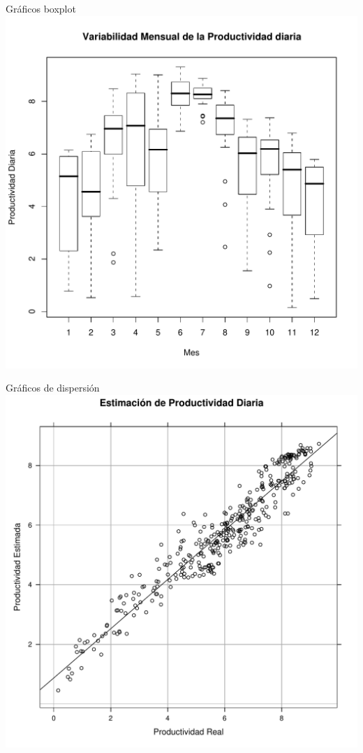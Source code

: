 \documentclass[xcolor={usenames,svgnames,dvipsnames}]{beamer}
\begin{document}
\begin{frame}[label=sec-7-2-3]{Gráficos boxplot}
\includegraphics[width=.9\linewidth]{../figs/GraficoBoxplot.pdf}
\end{frame}


\begin{frame}[label=sec-7-2-4]{Gráficos de dispersión}
\includegraphics[width=.9\linewidth]{../figs/GraficoDispersion.pdf}
\end{frame}
\end{document}
